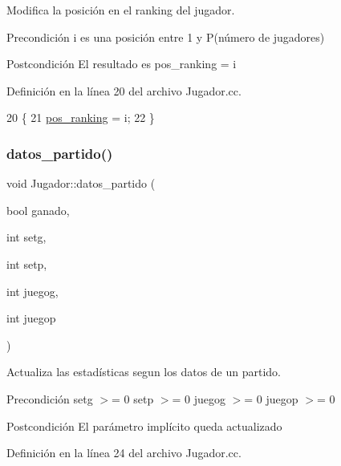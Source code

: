 Modifica la posición en el ranking del jugador. 

\begin{DoxyPrecond}{Precondición}
i es una posición entre 1 y P(número de jugadores) 
\end{DoxyPrecond}
\begin{DoxyPostcond}{Postcondición}
El resultado es pos\+\_\+ranking = i 
\end{DoxyPostcond}


Definición en la línea 20 del archivo Jugador.\+cc.


\begin{DoxyCode}
20                                 \{
21     \hyperlink{class_jugador_a200ee7c036d98654af6fab08b8b909e9}{pos\_ranking} = i;
22 \}
\end{DoxyCode}
\mbox{\label{class_jugador_a241e7729a48da6c6d94ef51326a45a18}} 
\subsubsection{\texorpdfstring{datos\+\_\+partido()}{datos\_partido()}}
{\footnotesize\ttfamily void Jugador\+::datos\+\_\+partido (\begin{DoxyParamCaption}\item[{bool}]{ganado,  }\item[{int}]{setg,  }\item[{int}]{setp,  }\item[{int}]{juegog,  }\item[{int}]{juegop }\end{DoxyParamCaption})}



Actualiza las estadísticas segun los datos de un partido. 

\begin{DoxyPrecond}{Precondición}
setg $>$= 0 setp $>$= 0 juegog $>$= 0 juegop $>$= 0 
\end{DoxyPrecond}
\begin{DoxyPostcond}{Postcondición}
El parámetro implícito queda actualizado 
\end{DoxyPostcond}


Definición en la línea 24 del archivo Jugador.\+cc.


